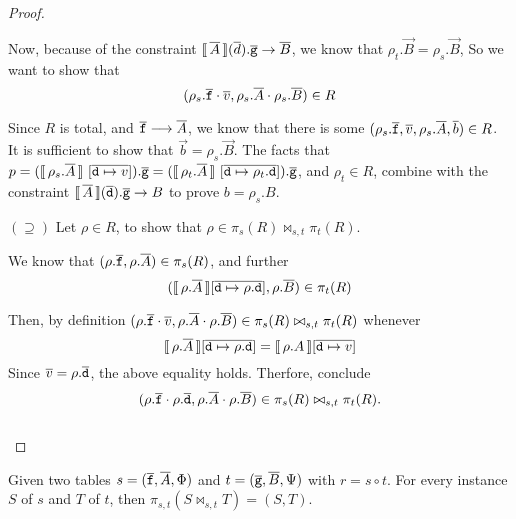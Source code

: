 \begin{proof}
\begin{enumerate}[align=left]
  \end{enumerate}

  Now, because of the constraint
  $\llbracket\,\overline{A}\,\rrbracket(\overline{d}).\overline{\texttt{g}} \to \overline{B}$, we know that
  $\rho_t.\vec B = \rho_s.\vec B$, So we want to show
  that
  \[(\rho_s.\overline{\texttt{f}}\cdot \overline{v}, \rho_s.\overline{A} \cdot \rho_s.\overline{B}) \in
    R\]

  Since $R$ is total, and $\overline{\texttt{f}} \longrightarrow \overline{A}$, we
  know that there is some
  $(\rho_s.\overline{\texttt{f}}, \overline{v}, \rho_s.\overline{A}, \overline{b}) \in R$. It is
  sufficient to show that $\vec b = \rho_s.\vec B$.  The facts that
  $p = (\llbracket\,\rho_s.\overline{A}\,\rrbracket~[\overline{\texttt{d} \mapsto
    v}]).\overline{\texttt{g}} = (\llbracket\,\rho_t.\overline{A}\,\rrbracket~[\overline{\texttt{d}
    \mapsto \rho_t.\texttt{d}}]).\overline{\texttt{g}}$, and $\rho_t \in R$,
  combine with the constraint
  $\llbracket\,\overline{A}\,\rrbracket(\overline{\texttt{d}}).\overline{\texttt{g}} \to B$ to
  prove $b = \rho_s.B$. \hfill \checkmark

\item[$(\supseteq)$] Let $\rho \in R$, to show
  that $\rho \in \pi_s(R) \bowtie_{s,t} \pi_t(R)$.

  We know that $(\rho.\overline{\texttt{f}}, \rho.\overline{A}) \in \pi_s(R)$, and further
  \[(\llbracket\,\rho.\overline{A}\,\rrbracket[\overline{\texttt{d} \mapsto \rho.\texttt{d}}],\rho.\overline{B}) \in
    \pi_t(R)\]

  Then, by definition
  $(\rho.\overline{\texttt{f}}\cdot \overline{v}, \rho.\overline{A}\cdot \rho.\overline{B}) \in \pi_s(R)
  \bowtie_{s,t} \pi_t(R)$ whenever
  \[\llbracket\,\rho.\overline{A}\,\rrbracket[\overline{\texttt{d} \mapsto \rho.\texttt{d}}]
    = \llbracket\,\rho.A\,\rrbracket[\overline{\texttt{d} \mapsto v}]\] Since
  $\overline{v} = \rho.\overline{\texttt{d}}$, the above equality holds. Therfore,
  conclude
  \[(\rho.\overline{\texttt{f}}\cdot \rho.\overline{\texttt{d}}, \rho.\overline{A} \cdot \rho.\overline{B}) \in \pi_s(R)
    \bowtie_{s,t} \pi_t(R).\]
  \mbox{} \hfill \checkmark\\\mbox{}
\end{proof}

\begin{proposition}
  \label{prop:proj-join}
  Given two tables $s = (\overline{\texttt{f}},\overline{A}, \Phi)$ and
  $t = (\overline{\texttt{g}},\overline{B}, \Psi)$ with $r = s \circ t$. For every
  instance $S$ of $s$ and $T$ of $t$, then
  $\pi_{s,t}(S \bowtie_{s,t} T) = (S,T)$.
\end{proposition}

